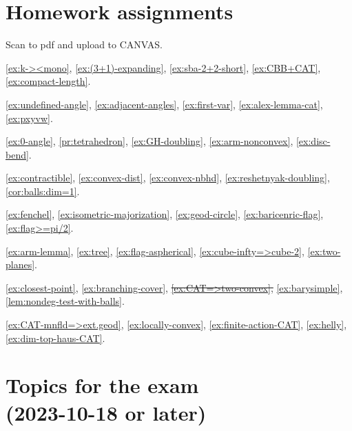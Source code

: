 \chapter*{Homework assignments}

Scan to pdf and upload to CANVAS.

\ref{ex:k-><mono},
\ref{ex:(3+1)-expanding},
\ref{ex:sba-2+2-short},
\ref{ex:CBB+CAT},
\ref{ex:compact-length}.

\ref{ex:undefined-angle},
\ref{ex:adjacent-angles},
\ref{ex:first-var},
\ref{ex:alex-lemma-cat},
\ref{ex:pxyvw}.

\ref{ex:0-angle},
\ref{pr:tetrahedron},
\ref{ex:GH-doubling},
\ref{ex:arm-nonconvex},
\ref{ex:disc-bend}.

\ref{ex:contractible},
\ref{ex:convex-dist},
\ref{ex:convex-nbhd},
\ref{ex:reshetnyak-doubling},
\ref{cor:balls:dim=1}.

\ref{ex:fenchel},
\ref{ex:isometric-majorization},
\ref{ex:geod-circle},
\ref{ex:baricenric-flag},
\ref{ex:flag>=pi/2}.

\ref{ex:arm-lemma},
\ref{ex:tree},
\ref{ex:flag-aspherical},
\ref{ex:cube-infty=>cube-2},
\ref{ex:two-planes}.

\ref{ex:closest-point},
\ref{ex:branching-cover},
\sout{\ref{ex:CAT=>two-convex},}
\ref{ex:barysimple},
\ref{lem:nondeg-test-with-balls}.

\ref{ex:CAT-mnfld=>ext.geod},
\ref{ex:locally-convex},
\ref{ex:finite-action-CAT},
\ref{ex:helly},
\ref{ex:dim-top-haus-CAT}.


\newpage

\chapter*{Topics for the exam\\ (2023-10-18
or later)}

